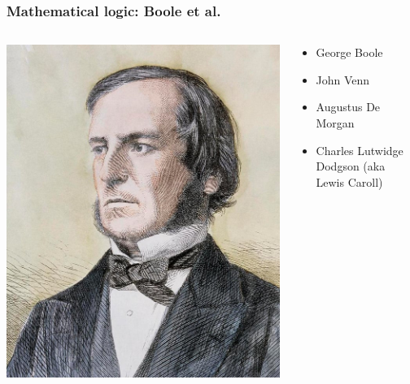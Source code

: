 \begin{frame}
  \frametitle{Mathematical logic: Boole et al.}

  \begin{columns}
    \begin{column}{.5\textwidth}
    \includegraphics[width=\textwidth]{../assets/boole}
    \end{column}
    \begin{column}{.5\textwidth}
      \begin{itemize}
        \item George Boole
        \item John Venn
        \item Augustus De Morgan
        \item Charles Lutwidge Dodgson (aka Lewis Caroll)
      \end{itemize}
    \end{column}
  \end{columns}
\end{frame}

